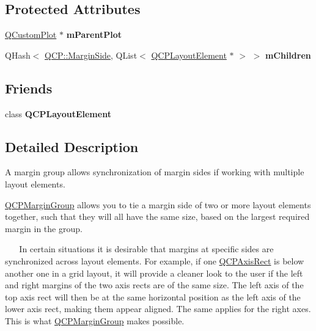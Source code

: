 \subsection*{Protected Attributes}
\begin{DoxyCompactItemize}
\item 
\hyperlink{classQCustomPlot}{Q\+Custom\+Plot} $\ast$ {\bfseries m\+Parent\+Plot}\hypertarget{classQCPMarginGroup_a23cfa29e3cc0f33a59141b77d8c04edf}{}\label{classQCPMarginGroup_a23cfa29e3cc0f33a59141b77d8c04edf}

\item 
Q\+Hash$<$ \hyperlink{namespaceQCP_a7e487e3e2ccb62ab7771065bab7cae54}{Q\+C\+P\+::\+Margin\+Side}, Q\+List$<$ \hyperlink{classQCPLayoutElement}{Q\+C\+P\+Layout\+Element} $\ast$ $>$ $>$ {\bfseries m\+Children}\hypertarget{classQCPMarginGroup_a954bc89ff8958b9bb6a4a0d08ed5fc0f}{}\label{classQCPMarginGroup_a954bc89ff8958b9bb6a4a0d08ed5fc0f}

\end{DoxyCompactItemize}
\subsection*{Friends}
\begin{DoxyCompactItemize}
\item 
class {\bfseries Q\+C\+P\+Layout\+Element}\hypertarget{classQCPMarginGroup_a0790750c7e7f14fdbd960d172655b42b}{}\label{classQCPMarginGroup_a0790750c7e7f14fdbd960d172655b42b}

\end{DoxyCompactItemize}


\subsection{Detailed Description}
A margin group allows synchronization of margin sides if working with multiple layout elements. 

\hyperlink{classQCPMarginGroup}{Q\+C\+P\+Margin\+Group} allows you to tie a margin side of two or more layout elements together, such that they will all have the same size, based on the largest required margin in the group.

~\newline
~\newline
 In certain situations it is desirable that margins at specific sides are synchronized across layout elements. For example, if one \hyperlink{classQCPAxisRect}{Q\+C\+P\+Axis\+Rect} is below another one in a grid layout, it will provide a cleaner look to the user if the left and right margins of the two axis rects are of the same size. The left axis of the top axis rect will then be at the same horizontal position as the left axis of the lower axis rect, making them appear aligned. The same applies for the right axes. This is what \hyperlink{classQCPMarginGroup}{Q\+C\+P\+Margin\+Group} makes possible.


